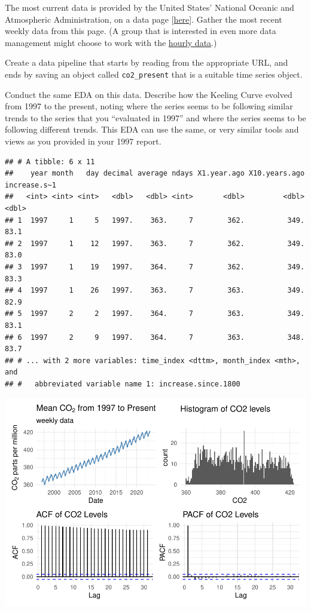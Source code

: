 \documentclass[AER]{AEA}
\begin{document}
The most current data is provided by the United States' National Oceanic
and Atmospheric Administration, on a data page
{[}\href{https://gml.noaa.gov/ccgg/trends/data.html}{here}{]}. Gather
the most recent weekly data from this page. (A group that is interested
in even more data management might choose to work with the
\href{https://gml.noaa.gov/aftp/data/trace_gases/co2/in-situ/surface/mlo/co2_mlo_surface-insitu_1_ccgg_HourlyData.txt}{hourly
data}.)

Create a data pipeline that starts by reading from the appropriate URL,
and ends by saving an object called \texttt{co2\_present} that is a
suitable time series object.

Conduct the same EDA on this data. Describe how the Keeling Curve
evolved from 1997 to the present, noting where the series seems to be
following similar trends to the series that you ``evaluated in 1997''
and where the series seems to be following different trends. This EDA
can use the same, or very similar tools and views as you provided in
your 1997 report.

\begin{verbatim}
## # A tibble: 6 x 11
##    year month   day decimal average ndays X1.year.ago X10.years.ago increase.s~1
##   <int> <int> <int>   <dbl>   <dbl> <int>       <dbl>         <dbl>        <dbl>
## 1  1997     1     5   1997.    363.     7        362.          349.         83.1
## 2  1997     1    12   1997.    363.     7        362.          349.         83.0
## 3  1997     1    19   1997.    364.     7        362.          349.         83.3
## 4  1997     1    26   1997.    363.     7        363.          349.         82.9
## 5  1997     2     2   1997.    364.     7        363.          349.         83.1
## 6  1997     2     9   1997.    364.     7        363.          348.         83.7
## # ... with 2 more variables: time_index <dttm>, month_index <mth>, and
## #   abbreviated variable name 1: increase.since.1800
\end{verbatim}

\includegraphics{Lab2_Group_report_files/figure-latex/unnamed-chunk-13-1.pdf}
\end{document}
